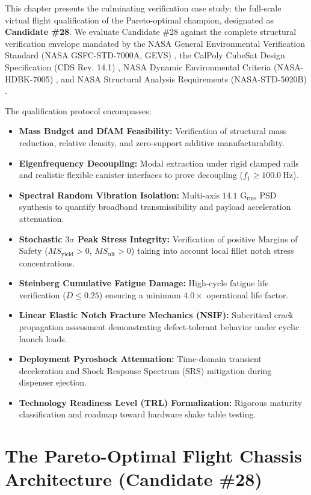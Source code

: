 This chapter presents the culminating verification case study: the full-scale virtual flight qualification of the Pareto-optimal champion, designated as \textbf{Candidate \#28}. We evaluate Candidate \#28 against the complete structural verification envelope mandated by the NASA General Environmental Verification Standard (NASA GSFC-STD-7000A, GEVS) \cite{nasa2013}, the CalPoly CubeSat Design Specification (CDS Rev. 14.1) \cite{calpoly2022}, NASA Dynamic Environmental Criteria (NASA-HDBK-7005) \cite{nasa2001}, and NASA Structural Analysis Requirements (NASA-STD-5020B) \cite{nasa2022}.

The qualification protocol encompasses:
\begin{itemize}
\item \textbf{Mass Budget and DfAM Feasibility:} Verification of structural mass reduction, relative density, and zero-support additive manufacturability.
\item \textbf{Eigenfrequency Decoupling:} Modal extraction under rigid clamped rails and realistic flexible canister interfaces to prove decoupling ($f_1 \ge \SI{100.0}{\hertz}$).
\item \textbf{Spectral Random Vibration Isolation:} Multi-axis $14.1\text{ G}_{\text{rms}}$ PSD synthesis to quantify broadband transmissibility and payload acceleration attenuation.
\item \textbf{Stochastic $3\sigma$ Peak Stress Integrity:} Verification of positive Margins of Safety ($MS_{\text{yield}} > 0$, $MS_{\text{ult}} > 0$) taking into account local fillet notch stress concentrations.
\item \textbf{Steinberg Cumulative Fatigue Damage:} High-cycle fatigue life verification ($D \le 0.25$) ensuring a minimum $4.0\times$ operational life factor.
\item \textbf{Linear Elastic Notch Fracture Mechanics (NSIF):} Subcritical crack propagation assessment demonstrating defect-tolerant behavior under cyclic launch loads.
\item \textbf{Deployment Pyroshock Attenuation:} Time-domain transient deceleration and Shock Response Spectrum (SRS) mitigation during dispenser ejection.
\item \textbf{Technology Readiness Level (TRL) Formalization:} Rigorous maturity classification and roadmap toward hardware shake table testing.
\end{itemize}

\section{The Pareto-Optimal Flight Chassis Architecture (Candidate \#28)}
\label{sec:optimal_architecture}

